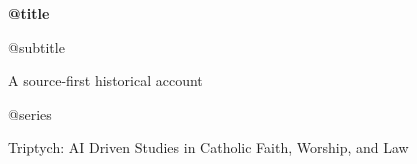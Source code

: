 \hypersetup{pageanchor=false}
\begin{titlepage}
  \thispagestyle{empty}
  \centering
  \vspace*{0.12\textheight}
  {\Huge\bfseries @{title}\par}
  \vspace{0.9em}
  {\Large @{subtitle}\par}
  \vspace{1.6em}
  {\large A source-first historical account\par}
  \vspace{0.6em}
  {\normalsize @{series}\par}
  \vfill
  {\small Triptych: AI Driven Studies in Catholic Faith, Worship, and Law\par}
\end{titlepage}
